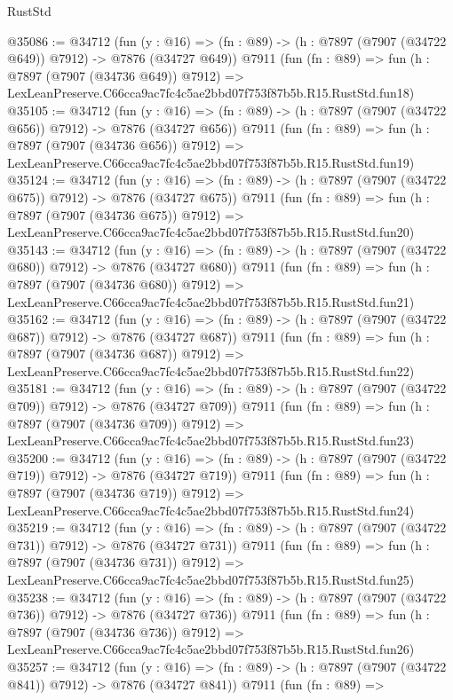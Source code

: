 \begin{lexlean}{RustStd}
\begin{coremodule}
@35086 := @34712
    (fun (y : @16) => (fn : @89) -> (h : @7897 (@7907 (@34722 @649)) @7912) -> @7876 (@34727 @649))
    @7911
    (fun (fn : @89) =>
    fun (h : @7897 (@7907 (@34736 @649)) @7912) =>
    LexLeanPreserve.C66cca9ac7fc4c5ae2bbd07f753f87b5b.R15.RustStd.fun18)
@35105 := @34712
    (fun (y : @16) => (fn : @89) -> (h : @7897 (@7907 (@34722 @656)) @7912) -> @7876 (@34727 @656))
    @7911
    (fun (fn : @89) =>
    fun (h : @7897 (@7907 (@34736 @656)) @7912) =>
    LexLeanPreserve.C66cca9ac7fc4c5ae2bbd07f753f87b5b.R15.RustStd.fun19)
@35124 := @34712
    (fun (y : @16) => (fn : @89) -> (h : @7897 (@7907 (@34722 @675)) @7912) -> @7876 (@34727 @675))
    @7911
    (fun (fn : @89) =>
    fun (h : @7897 (@7907 (@34736 @675)) @7912) =>
    LexLeanPreserve.C66cca9ac7fc4c5ae2bbd07f753f87b5b.R15.RustStd.fun20)
@35143 := @34712
    (fun (y : @16) => (fn : @89) -> (h : @7897 (@7907 (@34722 @680)) @7912) -> @7876 (@34727 @680))
    @7911
    (fun (fn : @89) =>
    fun (h : @7897 (@7907 (@34736 @680)) @7912) =>
    LexLeanPreserve.C66cca9ac7fc4c5ae2bbd07f753f87b5b.R15.RustStd.fun21)
@35162 := @34712
    (fun (y : @16) => (fn : @89) -> (h : @7897 (@7907 (@34722 @687)) @7912) -> @7876 (@34727 @687))
    @7911
    (fun (fn : @89) =>
    fun (h : @7897 (@7907 (@34736 @687)) @7912) =>
    LexLeanPreserve.C66cca9ac7fc4c5ae2bbd07f753f87b5b.R15.RustStd.fun22)
@35181 := @34712
    (fun (y : @16) => (fn : @89) -> (h : @7897 (@7907 (@34722 @709)) @7912) -> @7876 (@34727 @709))
    @7911
    (fun (fn : @89) =>
    fun (h : @7897 (@7907 (@34736 @709)) @7912) =>
    LexLeanPreserve.C66cca9ac7fc4c5ae2bbd07f753f87b5b.R15.RustStd.fun23)
@35200 := @34712
    (fun (y : @16) => (fn : @89) -> (h : @7897 (@7907 (@34722 @719)) @7912) -> @7876 (@34727 @719))
    @7911
    (fun (fn : @89) =>
    fun (h : @7897 (@7907 (@34736 @719)) @7912) =>
    LexLeanPreserve.C66cca9ac7fc4c5ae2bbd07f753f87b5b.R15.RustStd.fun24)
@35219 := @34712
    (fun (y : @16) => (fn : @89) -> (h : @7897 (@7907 (@34722 @731)) @7912) -> @7876 (@34727 @731))
    @7911
    (fun (fn : @89) =>
    fun (h : @7897 (@7907 (@34736 @731)) @7912) =>
    LexLeanPreserve.C66cca9ac7fc4c5ae2bbd07f753f87b5b.R15.RustStd.fun25)
@35238 := @34712
    (fun (y : @16) => (fn : @89) -> (h : @7897 (@7907 (@34722 @736)) @7912) -> @7876 (@34727 @736))
    @7911
    (fun (fn : @89) =>
    fun (h : @7897 (@7907 (@34736 @736)) @7912) =>
    LexLeanPreserve.C66cca9ac7fc4c5ae2bbd07f753f87b5b.R15.RustStd.fun26)
@35257 := @34712
    (fun (y : @16) => (fn : @89) -> (h : @7897 (@7907 (@34722 @841)) @7912) -> @7876 (@34727 @841))
    @7911
    (fun (fn : @89) =>

\end{coremodule}
\end{lexlean}
